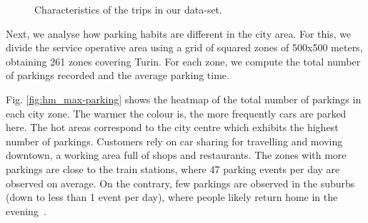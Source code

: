 \begin{figure}[th]
    \centering
        \caption{Characteristics of the trips in our data-set.}
        \label{}
\end{figure}


Next, we analyse how parking habits are different in the city area. For this, we divide the service operative area using a grid of squared zones of 500x500 meters, obtaining 261 zones covering Turin.
For each zone, we compute the total number of parkings recorded and the average parking time.




Fig. \ref{fig:hm_max-parking} shows the heatmap of the total number of parkings in each city zone. The warmer the colour is, the more frequently cars are parked here. The hot areas correspond to the city centre which exhibits the highest number of parkings. Customers rely on car sharing for travelling and moving downtown, a working area full of shops and restaurants. The zones with more parkings are close to the train stations, where 47 parking events per day are observed on average.
On the contrary, few parkings are observed in the suburbs (down to less than 1 event per day), where people likely return home in the evening~\cite{UMAP}. 

